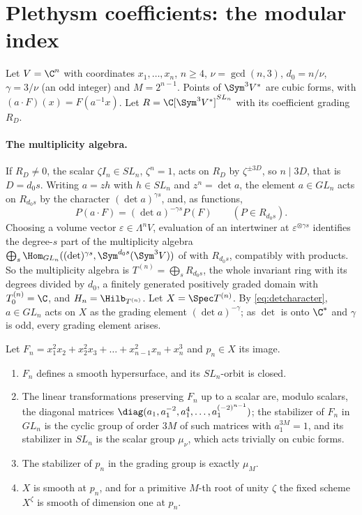 \section{Plethysm coefficients: the modular index}\label{sec:plethysm}

Let $V=\C^n$ with coordinates $x_1,\dots,x_n$, $n\ge4$, $\nu=\gcd(n,3)$,
$d_0=n/\nu$, $\gamma=3/\nu$ (an odd integer) and $M=2^{n-1}$. Points of
$\Sym^3V^*$ are cubic forms, with $(a\cdot F)(x)=F(a^{-1}x)$. Let
$R=\C[\Sym^3V^*]^{SL_n}$ with its coefficient grading $R_D$.

\paragraph{The multiplicity algebra.}
If $R_D\ne0$, the scalar $\zeta I_n\in SL_n$, $\zeta^n=1$, acts on $R_D$ by
$\zeta^{\pm3D}$, so $n\mid3D$, that is $D=d_0s$. Writing $a=zh$ with
$h\in SL_n$ and $z^n=\det a$, the element $a\in GL_n$ acts on $R_{d_0s}$ by the
character $(\det a)^{\gamma s}$, and, as functions,
\begin{equation}\label{eq:detcharacter}
 P(a\cdot F)=(\det a)^{-\gamma s}P(F)\qquad(P\in R_{d_0s}).
\end{equation}
Choosing a volume vector $\varepsilon\in\Lambda^nV$, evaluation of an
intertwiner at $\varepsilon^{\otimes\gamma s}$ identifies the degree-$s$ part
of the multiplicity algebra $\bigoplus_s\Hom_{GL_n}((\det)^{\gamma s},
\Sym^{d_0s}(\Sym^3V))$ of \cite[Section 4.1.2, eq.~(4.5)]{GCT6} with $R_{d_0s}$,
compatibly with products. So the multiplicity algebra is
$T^{(n)}=\bigoplus_sR_{d_0s}$, the whole invariant ring with its degrees
divided by $d_0$, a finitely generated positively graded domain with
$T^{(n)}_0=\C$, and $H_n=\Hilb_{T^{(n)}}$. Let $X=\Spec T^{(n)}$. By
\eqref{eq:detcharacter}, $a\in GL_n$ acts on $X$ as the grading element
$(\det a)^{-\gamma}$; as $\det$ is onto $\C^*$ and $\gamma$ is odd, every
grading element arises.

\begin{proposition}\label{prop:chaincubic}
Let $F_n=x_1^2x_2+x_2^2x_3+\dots+x_{n-1}^2x_n+x_n^3$ and $p_n\in X$ its image.
\begin{enumerate}
\item $F_n$ defines a smooth hypersurface, and its $SL_n$-orbit is closed.
\item The linear transformations preserving $F_n$ up to a scalar are, modulo
scalars, the diagonal matrices $\diag(a_1,a_1^{-2},a_1^4,\dots,
a_1^{(-2)^{n-1}})$; the stabilizer of $F_n$ in $GL_n$ is the cyclic group of
order $3M$ of such matrices with $a_1^{3M}=1$, and its stabilizer in $SL_n$ is
the scalar group $\mu_\nu$, which acts trivially on cubic forms.
\item The stabilizer of $p_n$ in the grading group is exactly $\mu_M$.
\item $X$ is smooth at $p_n$, and for a primitive $M$-th root of unity $\zeta$
the fixed scheme $X^\zeta$ is smooth of dimension one at $p_n$.
\end{enumerate}
\end{proposition}

